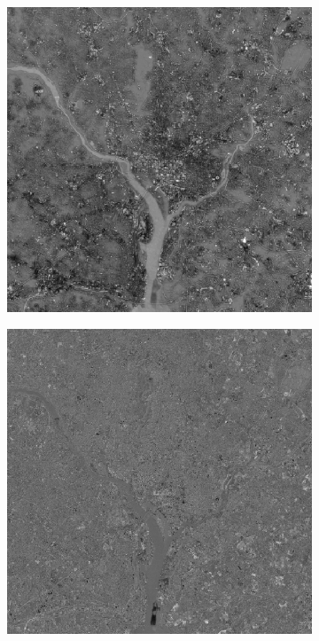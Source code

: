 \begin{figure}[h!]
\begin{subfigure}[b]{0.3\linewidth}
		\caption{}
		\label{fig:10components2}
	\end{subfigure}
	\begin{subfigure}[b]{0.3\linewidth}
		\includegraphics[width=\linewidth]{myfigure/p10/10_components_3.png}
		\caption{}
		\label{fig:10components3}
	\end{subfigure}
	\begin{subfigure}[b]{0.3\linewidth}
		\includegraphics[width=\linewidth]{myfigure/p10/10_components_4.png}

\end{subfigure}
\end{figure}
